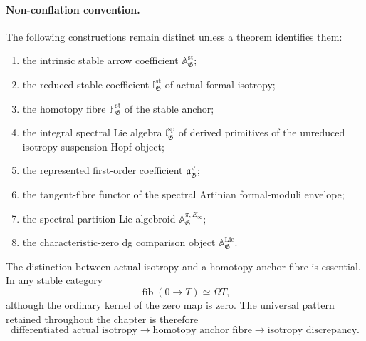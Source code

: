 \paragraph{Non-conflation convention.}
The following constructions remain distinct unless a theorem identifies them:
\begin{enumerate}
    \item the intrinsic stable arrow coefficient
    $\mathbb A^{\mathrm{st}}_{\mathfrak G}$;
    \item the reduced stable coefficient
    $\mathbb I^{\mathrm{st}}_{\mathfrak G}$ of actual formal isotropy;
    \item the homotopy fibre
    $\mathbb F^{\mathrm{st}}_{\mathfrak G}$ of the stable anchor;
    \item the integral spectral Lie algebra
    $\mathfrak l^{\mathrm{sp}}_{\mathfrak G}$ of derived primitives of the
    unreduced isotropy suspension Hopf object;
    \item the represented first-order coefficient
    $\mathfrak a^\vee_{\mathfrak G}$;
    \item the tangent-fibre functor of the spectral Artinian formal-moduli
    envelope;
    \item the spectral partition-Lie algebroid
    $\mathbb A^{\pi,E_\infty}_{\mathfrak G}$;
    \item the characteristic-zero dg comparison object
    $\mathbb A^{\mathrm{Lie}}_{\mathfrak G}$.
\end{enumerate}

The distinction between actual isotropy and a homotopy anchor fibre is
essential.  In any stable category
\[
    \operatorname{fib}(0\to T)\simeq\Omega T,
\]
although the ordinary kernel of the zero map is zero.  The universal pattern
retained throughout the chapter is therefore
\[
    \boxed{
    \text{differentiated actual isotropy}
    \longrightarrow
    \text{homotopy anchor fibre}
    \longrightarrow
    \text{isotropy discrepancy}.}
\]

